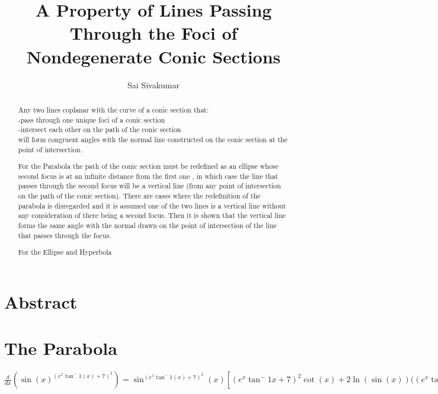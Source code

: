 \documentclass[11pt]{article}
\begin{document}
\title{\textbf{A Property of Lines Passing Through the Foci of Nondegenerate Conic Sections}}
\author{Sai Sivakumar}
\maketitle
\thispagestyle{empty}
\pagebreak
	
\tableofcontents
\thispagestyle{empty}
\clearpage
\pagebreak	

\setcounter{page}{1}

\section{Abstract}
\vfill
\begin{abstract}

Any two lines coplanar with the curve of a conic section that:\\
-pass through one unique foci of a conic section\\
-intersect each other on the path of the conic section\\
will form congruent angles with the normal line constructed on the conic section at the point of intersection.

For the Parabola the path of the conic section must be redefined as an ellipse whose second focus is at an infinite distance from the first one \cite{MSE}, in which case the line that passes through the second focus will be a vertical line (from any point of intersection on the path of the conic section). There are 
cases where the redefinition of the parabola is disregarded and it is assumed one of the two lines is a vertical line without any consideration of there being a second focus. Then it is shown that the vertical line forms the same angle with the normal drawn on the point of intersection of the line that passes through the focus.

For the Ellipse and Hyperbola 

\end{abstract}
\vfill
\pagebreak

\section{The Parabola}
$\frac{d}{dx}\left( \sin{(x)}^{(e^x\tan^-1{(x)}+7)^2} \right) = \sin^(e^x\tan^-1{(x)}+7)^2{(x)} \left[ {(e^x\tan^-1{x}+7)}^2\cot(x)+2\ln(\sin(x))((e^x\tan^-1{(x)}+7)(\frac{e^x}{x^2+1}+e^x\tan^-1({x})) \right] $

\pagebreak
	
\end{document}
